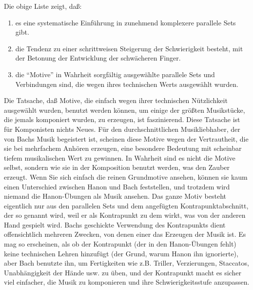 Die obige Liste zeigt, daß:

\begin{enumerate}[label={\roman*.}] 
\item es eine systematische Einführung in zunehmend komplexere parallele Sets gibt.
\item die Tendenz zu einer schrittweisen Steigerung der Schwierigkeit besteht, mit der Betonung der Entwicklung der schwächeren Finger.
\item die \enquote{Motive} in Wahrheit sorgfältig ausgewählte parallele Sets und Verbindungen sind, die wegen ihres technischen Werts ausgewählt wurden.
\end{enumerate}

Die Tatsache, daß Motive, die einfach wegen ihrer technischen Nützlichkeit ausgewählt wurden, benutzt werden können, um einige der größten Musikstücke, die jemals komponiert wurden, zu erzeugen, ist faszinierend.
Diese Tatsache ist für Komponisten nichts Neues.
Für den durchschnittlichen Musikliebhaber, der von Bachs Musik begeistert ist, scheinen diese Motive wegen der Vertrautheit, die sie  bei mehrfachem Anhören erzeugen, eine besondere Bedeutung mit scheinbar tiefem musikalischen Wert zu gewinnen.
In Wahrheit sind es nicht die Motive selbst, sondern wie sie in der Komposition benutzt werden, was den Zauber erzeugt.
Wenn Sie sich einfach die reinen Grundmotive ansehen, können sie kaum einen Unterschied zwischen Hanon und Bach feststellen, und trotzdem wird niemand die Hanon-Übungen als Musik ansehen.
Das ganze Motiv besteht eigentlich nur aus den parallelen Sets und dem angefügten Kontrapunktabschnitt, der so genannt wird, weil er als Kontrapunkt zu dem wirkt, was von der anderen Hand gespielt wird.
Bachs geschickte Verwendung des Kontrapunkts dient offensichtlich mehreren Zwecken, von denen einer das Erzeugen der Musik ist.
Es mag so erscheinen, als ob der Kontrapunkt (der in den Hanon-Übungen fehlt) keine technischen Lehren hinzufügt (der Grund, warum Hanon ihn ignorierte), aber Bach benutzte ihn, um Fertigkeiten wie z.B. Triller, Verzierungen, Staccatos, Unabhängigkeit der Hände usw. zu üben, und der Kontrapunkt macht es sicher viel einfacher, die Musik zu komponieren und ihre Schwierigkeitsstufe anzupassen.

